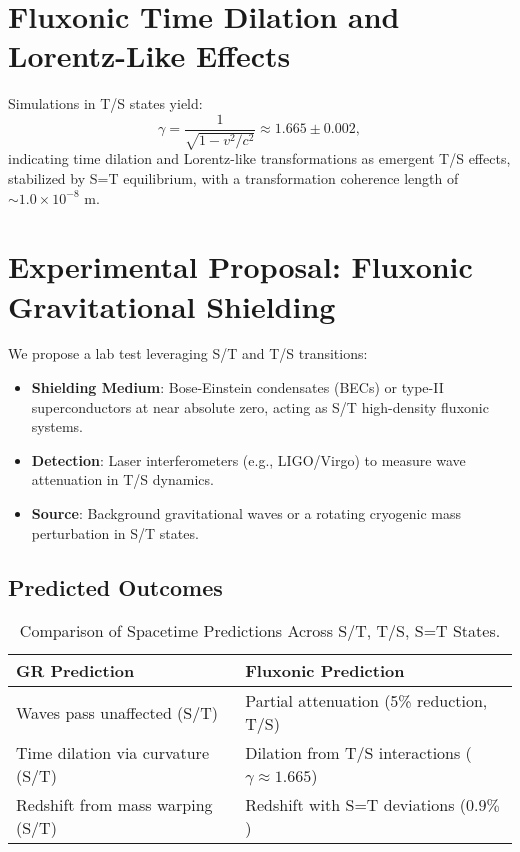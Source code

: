 \documentclass[11pt]{article}
\begin{document}
\section{Fluxonic Time Dilation and Lorentz-Like Effects}
Simulations in T/S states yield:
\begin{equation}
\gamma = \frac{1}{\sqrt{1 - v^2/c^2}} \approx 1.665 \pm 0.002,
\end{equation}
indicating time dilation and Lorentz-like transformations as emergent T/S effects, stabilized by S=T equilibrium, with a transformation coherence length of \(\sim 1.0 \times 10^{-8} \text{ m}\).

\section{Experimental Proposal: Fluxonic Gravitational Shielding}
We propose a lab test leveraging S/T and T/S transitions:
\begin{itemize}
    \item \textbf{Shielding Medium}: Bose-Einstein condensates (BECs) or type-II superconductors at near absolute zero, acting as S/T high-density fluxonic systems.
    \item \textbf{Detection}: Laser interferometers (e.g., LIGO/Virgo) to measure wave attenuation in T/S dynamics.
    \item \textbf{Source}: Background gravitational waves or a rotating cryogenic mass perturbation in S/T states.
\end{itemize}

\subsection{Predicted Outcomes}
\begin{table}[htbp]
    \centering
    \begin{tabular}{|p{4cm}|p{6cm}|}
        \hline
        \textbf{GR Prediction} & \textbf{Fluxonic Prediction} \\
        \hline
        Waves pass unaffected (S/T) & Partial attenuation (5\% reduction, T/S) \\
        Time dilation via curvature (S/T) & Dilation from T/S interactions (\(\gamma \approx 1.665\)) \\
        Redshift from mass warping (S/T) & Redshift with S=T deviations (\(0.9\%\)) \\
        \hline
    \end{tabular}
    \caption{Comparison of Spacetime Predictions Across S/T, T/S, S=T States.}
    \label{tab:predictions}
\end{table}
\end{document}
